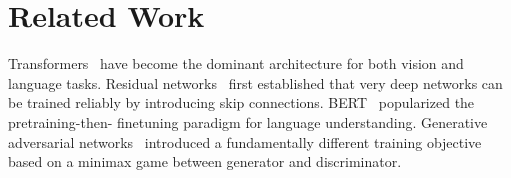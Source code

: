 \section{Related Work}

Transformers~\cite{vaswani2017attention} have become the dominant architecture
for both vision and language tasks. Residual networks~\cite{he2016resnet} first
established that very deep networks can be trained reliably by introducing
skip connections. BERT~\cite{devlin2018bert} popularized the pretraining-then-
finetuning paradigm for language understanding. Generative adversarial
networks~\cite{goodfellow2014gan} introduced a fundamentally different training
objective based on a minimax game between generator and discriminator.

